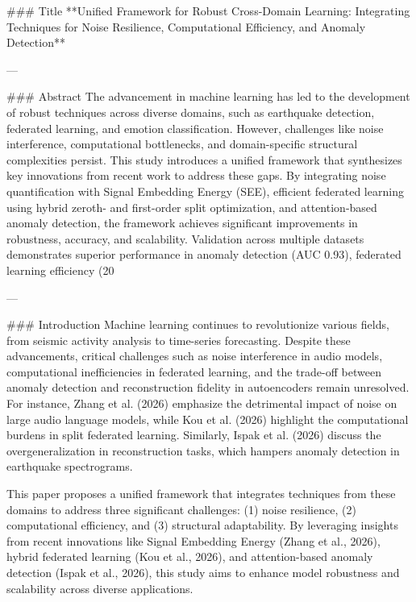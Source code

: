 ### Title  
**Unified Framework for Robust Cross-Domain Learning: Integrating Techniques for Noise Resilience, Computational Efficiency, and Anomaly Detection**

---

### Abstract  
The advancement in machine learning has led to the development of robust techniques across diverse domains, such as earthquake detection, federated learning, and emotion classification. However, challenges like noise interference, computational bottlenecks, and domain-specific structural complexities persist. This study introduces a unified framework that synthesizes key innovations from recent work to address these gaps. By integrating noise quantification with Signal Embedding Energy (SEE), efficient federated learning using hybrid zeroth- and first-order split optimization, and attention-based anomaly detection, the framework achieves significant improvements in robustness, accuracy, and scalability. Validation across multiple datasets demonstrates superior performance in anomaly detection (AUC 0.93), federated learning efficiency (20%

---

### Introduction  
Machine learning continues to revolutionize various fields, from seismic activity analysis to time-series forecasting. Despite these advancements, critical challenges such as noise interference in audio models, computational inefficiencies in federated learning, and the trade-off between anomaly detection and reconstruction fidelity in autoencoders remain unresolved. For instance, Zhang et al. (2026) emphasize the detrimental impact of noise on large audio language models, while Kou et al. (2026) highlight the computational burdens in split federated learning. Similarly, Ispak et al. (2026) discuss the overgeneralization in reconstruction tasks, which hampers anomaly detection in earthquake spectrograms.

This paper proposes a unified framework that integrates techniques from these domains to address three significant challenges: (1) noise resilience, (2) computational efficiency, and (3) structural adaptability. By leveraging insights from recent innovations like Signal Embedding Energy (Zhang et al., 2026), hybrid federated learning (Kou et al., 2026), and attention-based anomaly detection (Ispak et al., 2026), this study aims to enhance model robustness and scalability across diverse applications.

